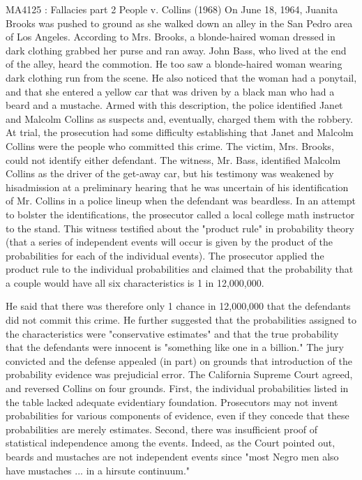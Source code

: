 MA4125 : Fallacies part 2
People v. Collins (1968)
On June 18, 1964, Juanita Brooks was pushed to ground as she walked down an alley in the
San Pedro area of Los Angeles. According to Mrs. Brooks, a blonde-haired woman dressed in
dark clothing grabbed her purse and ran away. John Bass, who lived at the end of the alley,
heard the commotion. He too saw a blonde-haired woman wearing dark clothing run from the
scene. He also noticed that the woman had a ponytail, and that she entered a yellow car
that was driven by a black man who had a beard and a mustache.
Armed with this description, the police identified Janet and Malcolm Collins as suspects
and, eventually, charged them with the robbery. At trial, the prosecution had some difficulty
establishing that Janet and Malcolm Collins were the people who committed this crime.
The victim, Mrs. Brooks, could not identify either defendant. The witness, Mr. Bass,
identified Malcolm Collins as the driver of the get-away car, but his testimony was
weakened by hisadmission at a preliminary hearing that he was uncertain of his identification
of Mr. Collins in a police lineup when the defendant was beardless.
In an attempt to bolster the identifications, the prosecutor called a local college math
instructor to the stand. This witness testified about the "product rule" in probability
theory (that a series of independent events will
occur is given by the product of the probabilities for each of the individual events).
The prosecutor applied the product rule to the individual probabilities and claimed that the probability that a couple would have all six characteristics is 1 in 12,000,000.

He said that there was therefore only 1 chance in 12,000,000 that the defendants did not
commit this crime. He further suggested that the probabilities assigned to the characteristics were "conservative estimates" and that the true probability that the defendants were innocent is "something like one in a billion."
The jury convicted and the defense appealed (in part) on grounds that introduction of the
probability evidence was prejudicial error. The California Supreme Court agreed,
and reversed Collins on four grounds. First, the individual probabilities listed in the
table lacked adequate evidentiary foundation. Prosecutors may not invent probabilities for various components of evidence, even if they concede that these probabilities are merely estimates. Second, there was insufficient proof of statistical independence among the events. Indeed, as the Court pointed out, beards and mustaches are not independent events since "most Negro men also have mustaches ... in a hirsute continuum."

